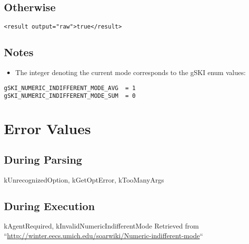 \documentclass[10pt]{article}
\begin{document}
\subsection*{ Otherwise }
\begin{verbatim}
<result output="raw">true</result>

\end{verbatim}
\subsection*{ Notes }
\begin{itemize}
\item  The integer denoting the current mode corresponds to the gSKI enum values: 

\end{itemize}
\begin{verbatim}
gSKI_NUMERIC_INDIFFERENT_MODE_AVG  = 1
gSKI_NUMERIC_INDIFFERENT_MODE_SUM  = 0

\end{verbatim}
\section*{ Error Values }
\subsection*{ During Parsing }


 kUnrecognizedOption, kGetOptError, kTooManyArgs
\subsection*{ During Execution }


 kAgentRequired, kInvalidNumericIndifferentMode Retrieved from ``\url{http://winter.eecs.umich.edu/soarwiki/Numeric-indifferent-mode}``
\end{document}

